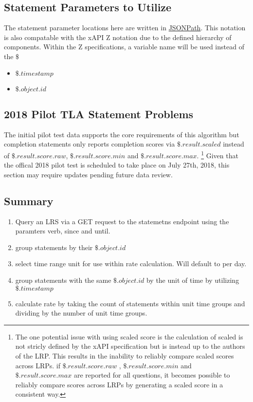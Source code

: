 \documentclass{article}
\begin{document}
\subsection{Statement Parameters to Utilize}

The statement parameter locations here are written in
\href{http://goessner.net/articles/JsonPath/}{JSONPath}. This notation
is also compatable with the xAPI Z notation due to the defined
hierarchy of components. Within the Z specifications, a variable name
will be used instead of the $\$$
\begin{itemize}
\item $\$.timestamp$
\item $\$.object.id$
\end{itemize}

\subsection{2018 Pilot TLA Statement Problems}

The initial pilot test data supports the core requirements of this
algorithm but completion statements only reports completion scores via
$\$.result.scaled$ instead of $\$.result.score.raw$,
$\$.result.score.min$ and $\$.result.score.max$.
\footnote{\label{scaledScores} The one potential issue with using scaled score is the
calculation of scaled is not stricly defined by the xAPI
specification but is instead up to the authors of the LRP. This
results in the inability to reliably compare scaled scores across LRPs.
if $\$.result.score.raw$ , $\$.result.score.min$ and
$\$.result.score.max$ are reported for all questions, it becomes
possible to reliably compare scores across LRPs by generating a scaled
score in a consistent way.} Given
that the offical 2018 pilot test is scheduled to take place on July
27th, 2018, this section may require updates pending future data
review.

\subsection{Summary}

\begin{enumerate}
  \item Query an LRS via a GET request to the statemetns endpoint
    using the paramters verb, since and until.
  \item group statements by their $\$.object.id$
  \item select time range unit for use within rate calculation. Will
    default to per day.
  \item group statements with the same $\$.object.id$ by the unit of
    time by utilizing $\$.timestamp$
  \item calculate rate by taking the count of statements within unit
    time groups and dividing by the number of unit time groups.
\end{enumerate}
\end{document}
